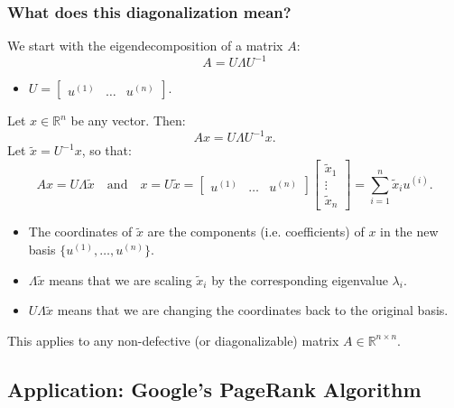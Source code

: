 \subsubsection{What does this diagonalization mean?}
\begin{intuition}
    We start with the eigendecomposition of a matrix \( A \):
    \[
    A = U \Lambda U^{-1}
    \]
    \begin{itemize}
        \item $U = \begin{bmatrix} u^{(1)} & \dots & u^{(n)} \end{bmatrix}.$
    \end{itemize}
    \vspace{1em}

    Let \( x \in \mathbb{R}^n \) be any vector. Then:
    \[
    A x = U \Lambda U^{-1} x.
    \]
    Let \( \tilde{x} = U^{-1} x \), so that:
    \[
    A x = U \Lambda \tilde{x} \quad \text{and} \quad x = U \tilde{x} = \begin{bmatrix} u^{(1)} & \dots & u^{(n)} \end{bmatrix} \begin{bmatrix} \tilde{x}_1 \\ \vdots \\ \tilde{x}_n \end{bmatrix} = \sum_{i=1}^{n} \tilde{x}_i u^{(i)}.
    \]
    \begin{itemize}
        \item The coordinates of \( \tilde{x} \) are the components (i.e. coefficients) of \( x \) in the new basis \( \{u^{(1)}, \dots, u^{(n)}\} \).
        \item \( \Lambda \tilde{x} \) means that we are scaling \( \tilde{x}_i \) by the corresponding eigenvalue \( \lambda_i \).
        \item \( U \Lambda \tilde{x} \) means that we are changing the coordinates back to the original basis.
    \end{itemize}
    \vspace{1em}

    This applies to any non-defective (or diagonalizable) matrix \( A \in \mathbb{R}^{n \times n} \).
\end{intuition}

\subsection{Application: Google's PageRank Algorithm}
